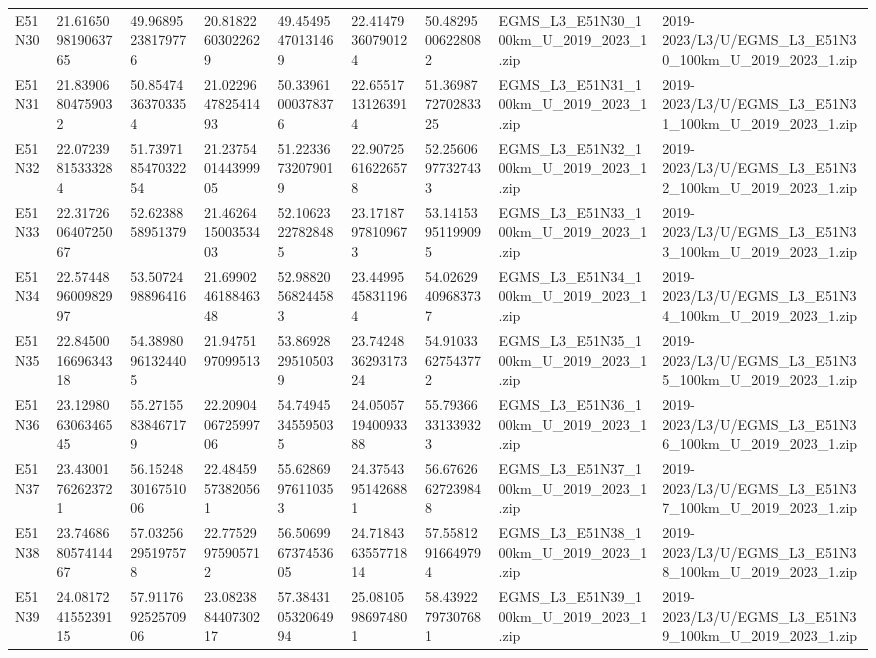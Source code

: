 \begin{landscape}
\begin{longtable}{lllllllll}
E51N30 & 21.616509819063765 & 49.96895238179776 & 20.81822603022629 & 49.45495470131469 & 22.41479360790124 & 50.48295006228082 & EGMS\_L3\_E51N30\_100km\_U\_2019\_2023\_1.zip & 2019-2023/L3/U/EGMS\_L3\_E51N30\_100km\_U\_2019\_2023\_1.zip \\
E51N31 & 21.83906804759032 & 50.85474363703354 & 21.022964782541493 & 50.33961000378376 & 22.65517131263914 & 51.369877270283325 & EGMS\_L3\_E51N31\_100km\_U\_2019\_2023\_1.zip & 2019-2023/L3/U/EGMS\_L3\_E51N31\_100km\_U\_2019\_2023\_1.zip \\
E51N32 & 22.07239815333284 & 51.739718547032254 & 21.237540144399905 & 51.22336732079019 & 22.90725616226578 & 52.25606977327433 & EGMS\_L3\_E51N32\_100km\_U\_2019\_2023\_1.zip & 2019-2023/L3/U/EGMS\_L3\_E51N32\_100km\_U\_2019\_2023\_1.zip \\
E51N33 & 22.317260640725067 & 52.6238858951379 & 21.462641500353403 & 52.10623227828485 & 23.17187978109673 & 53.14153951199095 & EGMS\_L3\_E51N33\_100km\_U\_2019\_2023\_1.zip & 2019-2023/L3/U/EGMS\_L3\_E51N33\_100km\_U\_2019\_2023\_1.zip \\
E51N34 & 22.574489600982997 & 53.5072498896416 & 21.699024618846348 & 52.98820568244583 & 23.44995458311964 & 54.02629409683737 & EGMS\_L3\_E51N34\_100km\_U\_2019\_2023\_1.zip & 2019-2023/L3/U/EGMS\_L3\_E51N34\_100km\_U\_2019\_2023\_1.zip \\
E51N35 & 22.845001669634318 & 54.38980961324405 & 21.9475197099513 & 53.86928295105039 & 23.742483629317324 & 54.91033627543772 & EGMS\_L3\_E51N35\_100km\_U\_2019\_2023\_1.zip & 2019-2023/L3/U/EGMS\_L3\_E51N35\_100km\_U\_2019\_2023\_1.zip \\
E51N36 & 23.129806306346545 & 55.27155838467179 & 22.209040672599706 & 54.74945345595035 & 24.050571940093388 & 55.79366331339323 & EGMS\_L3\_E51N36\_100km\_U\_2019\_2023\_1.zip & 2019-2023/L3/U/EGMS\_L3\_E51N36\_100km\_U\_2019\_2023\_1.zip \\
E51N37 & 23.43001762623721 & 56.152483016751006 & 22.48459573820561 & 55.62869976110353 & 24.37543951426881 & 56.67626627239848 & EGMS\_L3\_E51N37\_100km\_U\_2019\_2023\_1.zip & 2019-2023/L3/U/EGMS\_L3\_E51N37\_100km\_U\_2019\_2023\_1.zip \\
E51N38 & 23.746868057414467 & 57.03256295197578 & 22.77529975905712 & 56.506996737453605 & 24.718436355771814 & 57.55812916649794 & EGMS\_L3\_E51N38\_100km\_U\_2019\_2023\_1.zip & 2019-2023/L3/U/EGMS\_L3\_E51N38\_100km\_U\_2019\_2023\_1.zip \\
E51N39 & 24.081724155239115 & 57.911769252570906 & 23.082388440730217 & 57.384310532064994 & 25.08105986974801 & 58.43922797307681 & EGMS\_L3\_E51N39\_100km\_U\_2019\_2023\_1.zip & 2019-2023/L3/U/EGMS\_L3\_E51N39\_100km\_U\_2019\_2023\_1.zip \\

\end{longtable}
\end{landscape}
